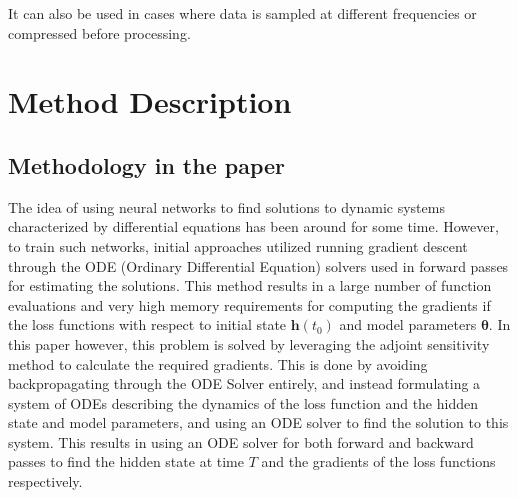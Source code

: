 \documentclass{article}
\begin{document}
It can also be used in cases where data is sampled at different frequencies or compressed before processing.
\newpage
\section{Method Description}

\subsection{Methodology in the paper}
The idea of using neural networks to find solutions to dynamic systems characterized by differential equations has been around for some time. However, to train such networks, initial approaches utilized running gradient descent through the ODE (Ordinary Differential Equation) solvers used in forward passes for estimating the solutions. This method results in a large number of function evaluations and very high memory requirements for computing the gradients if the loss functions with respect to initial state \(\mathbf{h}(t_0)\) and model parameters \(\mathbf{\theta}\). In this paper however, this problem is solved by leveraging the adjoint sensitivity method to calculate the required gradients. This is done by avoiding backpropagating through the ODE Solver entirely, and instead formulating a system of ODEs describing the dynamics of the loss function and the hidden state and model parameters, and using an ODE solver to find the solution to this system. This results in using an ODE solver for both forward and backward passes to find the hidden state at time $T$ and the gradients of the loss functions respectively. 



\end{document}
